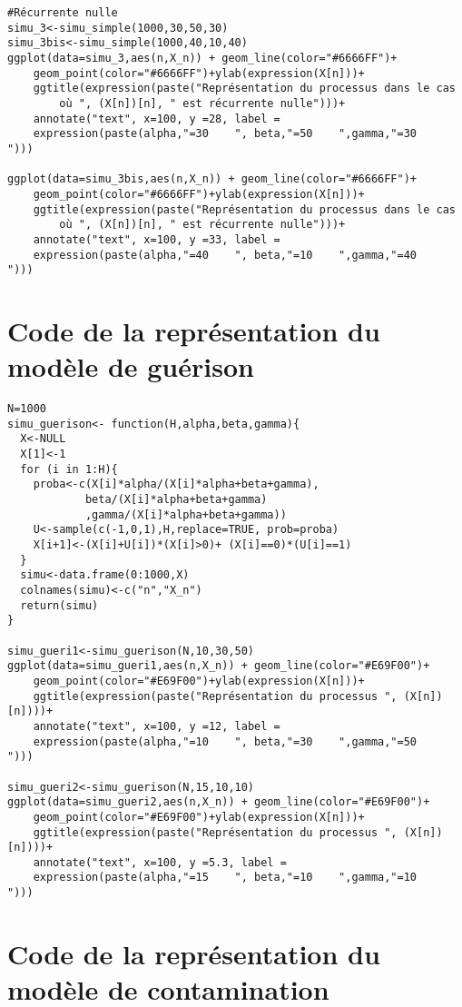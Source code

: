 \documentclass[12pt,a4paper]{report}
\theoremstyle{remark}
\begin{document}
\begin{lstlisting}
#Récurrente nulle
simu_3<-simu_simple(1000,30,50,30)
simu_3bis<-simu_simple(1000,40,10,40)
ggplot(data=simu_3,aes(n,X_n)) + geom_line(color="#6666FF")+
    geom_point(color="#6666FF")+ylab(expression(X[n]))+ 
    ggtitle(expression(paste("Représentation du processus dans le cas
        où ", (X[n])[n], " est récurrente nulle")))+
    annotate("text", x=100, y =28, label = 
    expression(paste(alpha,"=30    ", beta,"=50    ",gamma,"=30    ")))

ggplot(data=simu_3bis,aes(n,X_n)) + geom_line(color="#6666FF")+
    geom_point(color="#6666FF")+ylab(expression(X[n]))+ 
    ggtitle(expression(paste("Représentation du processus dans le cas 
        où ", (X[n])[n], " est récurrente nulle")))+
    annotate("text", x=100, y =33, label =
    expression(paste(alpha,"=40    ", beta,"=10    ",gamma,"=40    ")))
\end{lstlisting}

\section*{Code de la représentation du modèle de guérison}
\begin{lstlisting}
N=1000
simu_guerison<- function(H,alpha,beta,gamma){
  X<-NULL
  X[1]<-1
  for (i in 1:H){
    proba<-c(X[i]*alpha/(X[i]*alpha+beta+gamma),
            beta/(X[i]*alpha+beta+gamma)
            ,gamma/(X[i]*alpha+beta+gamma))
    U<-sample(c(-1,0,1),H,replace=TRUE, prob=proba)
    X[i+1]<-(X[i]+U[i])*(X[i]>0)+ (X[i]==0)*(U[i]==1)
  }
  simu<-data.frame(0:1000,X)
  colnames(simu)<-c("n","X_n")
  return(simu)
}

simu_gueri1<-simu_guerison(N,10,30,50)
ggplot(data=simu_gueri1,aes(n,X_n)) + geom_line(color="#E69F00")+
    geom_point(color="#E69F00")+ylab(expression(X[n]))+ 
    ggtitle(expression(paste("Représentation du processus ", (X[n])[n])))+
    annotate("text", x=100, y =12, label = 
    expression(paste(alpha,"=10    ", beta,"=30    ",gamma,"=50    ")))

simu_gueri2<-simu_guerison(N,15,10,10)
ggplot(data=simu_gueri2,aes(n,X_n)) + geom_line(color="#E69F00")+
    geom_point(color="#E69F00")+ylab(expression(X[n]))+ 
    ggtitle(expression(paste("Représentation du processus ", (X[n])[n])))+
    annotate("text", x=100, y =5.3, label = 
    expression(paste(alpha,"=15    ", beta,"=10    ",gamma,"=10    ")))
\end{lstlisting}

\section*{Code de la représentation du modèle de contamination}
\end{document}
